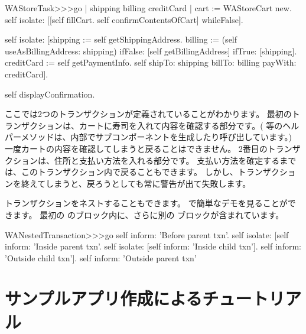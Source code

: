 \documentclass[a4paper,10pt,twoside]{book}
\begin{document}
\begin{code}{}
WAStoreTask>>>go
	| shipping billing creditCard |
	cart := WAStoreCart new.
	self isolate:
		[[self fillCart.
		self confirmContentsOfCart]
			whileFalse].

	self isolate:
		[shipping := self getShippingAddress.
		billing := (self useAsBillingAddress: shipping)
					ifFalse: [self getBillingAddress]
					ifTrue: [shipping].
		creditCard := self getPaymentInfo.
		self shipTo: shipping billTo: billing payWith: creditCard].

	self displayConfirmation.
\end{code}

ここでは2つのトランザクションが定義されていることがわかります。
最初のトランザクションは、カートに寿司を入れて内容を確認する部分です。(  等のヘルパーメソッドは、内部でサブコンポーネントを生成したり呼び出しています。)
一度カートの内容を確認してしまうと戻ることはできません。
2番目のトランザクションは、住所と支払い方法を入れる部分です。
支払い方法を確定するまでは、このトランザクション内で戻ることもできます。
しかし、トランザクションを終えてしまうと、戻ろうとしても常に警告が出て失敗します。

トランザクションをネストすることもできます。
で簡単なデモを見ることができます。
最初の のブロック内に、さらに別の ブロックが含まれています。

\begin{code}{}
WANestedTransaction>>>go
	self inform: 'Before parent txn'.
	self isolate:
			[self inform: 'Inside parent txn'.
			self isolate: [self inform: 'Inside child txn'].
			self inform: 'Outside child txn'].
	self inform: 'Outside parent txn'
\end{code}


\section{サンプルアプリ作成によるチュートリアル}
\end{document}
